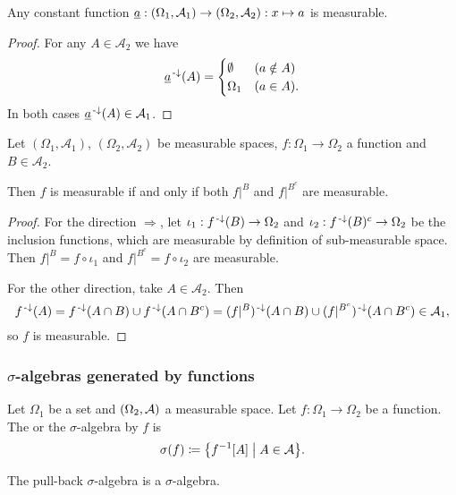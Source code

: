 \begin{lemma} \label{constantFunctionsMeasurable}
Any constant function $\underline{a}: \sSet{\Omega_1,\mathcal{A}_1} \to \sSet{\Omega_2,\mathcal{A}_2}: x\mapsto a$ is measurable.
\end{lemma}
\begin{proof}
For any $A\in\mathcal{A}_2$ we have
\[ \underline{a}^{{\text{\hspace{0.15em}-}\downarrow}}(A) = \begin{cases}
\emptyset & (a\notin A) \\
\Omega_1 & (a\in A).
\end{cases} \]
In both cases $\underline{a}^{{\text{\hspace{0.15em}-}\downarrow}}(A)\in\mathcal{A}_1$.
\end{proof}

\begin{lemma} \label{measurabilityCodomainPartition}
Let $(\Omega_1, \mathcal{A}_1)$, $(\Omega_2, \mathcal{A}_2)$ be measurable spaces, $f: \Omega_1 \to \Omega_2$ a function and $B\in \mathcal{A}_2$.

Then $f$ is measurable \textup{if and only if} both $f|^B$ and $f|^{B^c}$ are measurable.
\end{lemma}
\begin{proof}
For the direction $\Rightarrow$, let $\iota_1: f^{\text{\hspace{0.15em}-}\downarrow}(B)\to \Omega_2$ and $\iota_2: f^{\text{\hspace{0.15em}-}\downarrow}(B)^c\to \Omega_2$ be the inclusion functions, which are measurable by definition of sub-measurable space. Then $f|^B = f\circ \iota_1$ and $f|^{B^c} = f\circ \iota_2$ are measurable.

For the other direction, take $A\in \mathcal{A}_2$. Then
\[ f^{{\text{\hspace{0.15em}-}\downarrow}}(A) = f^{\text{\hspace{0.15em}-}\downarrow}(A\cap B) \cup f^{\text{\hspace{0.15em}-}\downarrow}(A\cap B^c) = (f|^B)^{\text{\hspace{0.15em}-}\downarrow}(A\cap B) \cup (f|^{B^c})^{\text{\hspace{0.15em}-}\downarrow}(A\cap B^c) \in \mathcal{A}_1, \]
so $f$ is measurable.
\end{proof}

\subsubsection{$\sigma$-algebras generated by functions}
\begin{definition}
Let $\Omega_1$ be a set and $\sSet{\Omega_2, \mathcal{A}}$ a measurable space. Let $f: \Omega_1\to \Omega_2$ be a function. The  or the $\sigma$-algebra  by $f$ is
\[ \sigma(f) \defeq \setbuilder{f^{-1}[A]}{A\in \mathcal{A}}. \]
\end{definition}

The pull-back $\sigma$-algebra is a $\sigma$-algebra.

